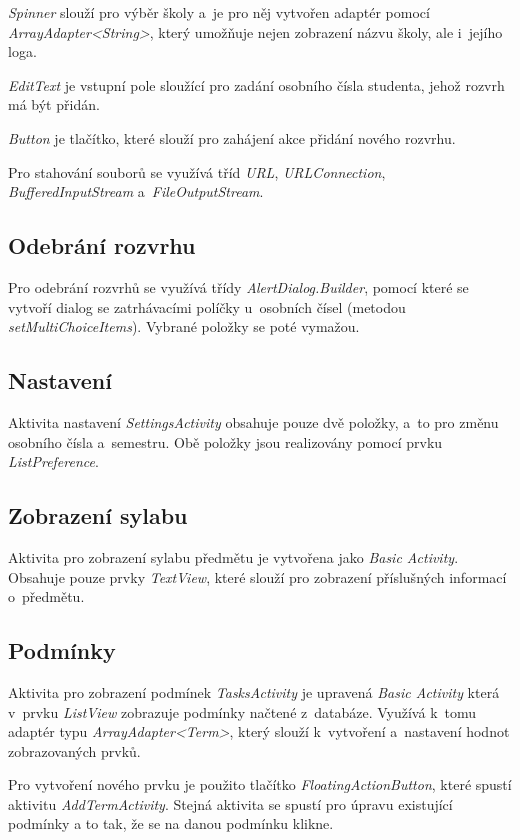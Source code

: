 \documentclass[12pt, a4paper]{article}
\begin{document}
		\emph{Spinner} slouží pro výběr školy a~je pro něj vytvořen adaptér pomocí \emph{ArrayAdapter\textless String\textgreater}, který umožňuje nejen zobrazení názvu školy, ale i~jejího loga.
		
		\emph{EditText} je vstupní pole sloužící pro zadání osobního čísla studenta, jehož rozvrh má být přidán.
		
		\emph{Button} je tlačítko, které slouží pro zahájení akce přidání nového rozvrhu.
		
		Pro stahování souborů se využívá tříd \emph{URL}, \emph{URLConnection}, \emph{BufferedInputStream} a~\emph{FileOutputStream}.
		
		\subsection{Odebrání rozvrhu}
		Pro odebrání rozvrhů se využívá třídy \emph{AlertDialog.Builder}, pomocí které se vytvoří dialog se zatrhávacími políčky u~osobních čísel (metodou \emph{setMultiChoiceItems}). Vybrané položky se poté vymažou.
		
		\subsection{Nastavení}
		Aktivita nastavení \emph{SettingsActivity} obsahuje pouze dvě položky, a~to pro změnu osobního čísla a~semestru. Obě položky jsou realizovány pomocí prvku \emph{ListPreference}.
		
		\subsection{Zobrazení sylabu}
		Aktivita pro zobrazení sylabu předmětu je vytvořena jako \emph{Basic Activity}. Obsahuje pouze prvky \emph{TextView}, které slouží pro zobrazení příslušných informací o~předmětu.
		
		\subsection{Podmínky}
		Aktivita pro zobrazení podmínek \emph{TasksActivity} je upravená \emph{Basic Activity} která v~prvku \emph{ListView} zobrazuje podmínky načtené z~databáze. Využívá k~tomu adaptér typu \emph{ArrayAdapter\textless Term\textgreater}, který slouží k~vytvoření a~nastavení hodnot zobrazovaných prvků.
		
		Pro vytvoření nového prvku je použito tlačítko \emph{FloatingActionButton}, které spustí aktivitu \emph{AddTermActivity}. Stejná aktivita se spustí pro úpravu existující podmínky a to tak, že se na danou podmínku klikne.
	
\end{document}
